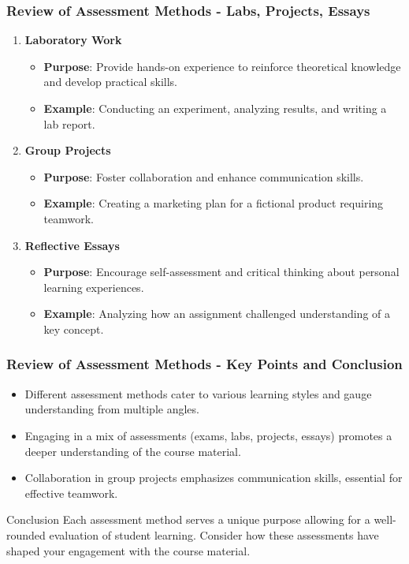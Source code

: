 \documentclass{beamer}
\begin{document}
\begin{frame}[fragile]
    \frametitle{Review of Assessment Methods - Labs, Projects, Essays}
    \begin{enumerate}
        \item \textbf{Laboratory Work}
            \begin{itemize}
                \item \textbf{Purpose}: Provide hands-on experience to reinforce theoretical knowledge and develop practical skills.
                \item \textbf{Example}: Conducting an experiment, analyzing results, and writing a lab report.
            \end{itemize}

        \item \textbf{Group Projects}
            \begin{itemize}
                \item \textbf{Purpose}: Foster collaboration and enhance communication skills.
                \item \textbf{Example}: Creating a marketing plan for a fictional product requiring teamwork.
            \end{itemize}

        \item \textbf{Reflective Essays}
            \begin{itemize}
                \item \textbf{Purpose}: Encourage self-assessment and critical thinking about personal learning experiences.
                \item \textbf{Example}: Analyzing how an assignment challenged understanding of a key concept.
            \end{itemize}
    \end{enumerate}
\end{frame}

\begin{frame}[fragile]
    \frametitle{Review of Assessment Methods - Key Points and Conclusion}
    \begin{itemize}
        \item Different assessment methods cater to various learning styles and gauge understanding from multiple angles.
        \item Engaging in a mix of assessments (exams, labs, projects, essays) promotes a deeper understanding of the course material.
        \item Collaboration in group projects emphasizes communication skills, essential for effective teamwork.
    \end{itemize}
    
    \begin{block}{Conclusion}
        Each assessment method serves a unique purpose allowing for a well-rounded evaluation of student learning. Consider how these assessments have shaped your engagement with the course material.
    \end{block}
\end{frame}
\end{document}
